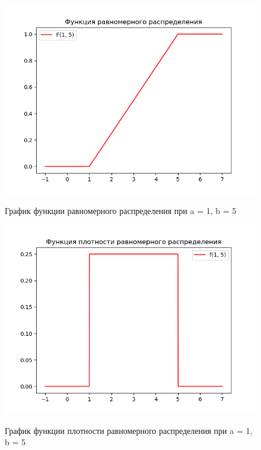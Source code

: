 \begin{figure}[h]
	\centering
	\includegraphics[scale = 0.45]{img/1.png}
	\label{fig:screenshot001}
	\caption{График функции равномерного распределения при a = 1, b = 5}
\end{figure}

\begin{figure}[h]
	\centering
	\includegraphics[scale = 0.45]{img/2.png}
	\label{fig:screenshot002}
	\caption{График функции плотности равномерного распределения при a = 1, b = 5}
\end{figure}

